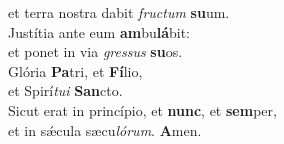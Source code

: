 \oddverse et terra nostra dabit \textit{fru}\textit{ctum} \textbf{su}um.\\
\evenverse Justítia ante eum \textbf{am}bu\textbf{lá}bit:~\*\\
\evenverse et ponet in via \textit{gres}\textit{sus} \textbf{su}os.\\
\oddverse Glória \textbf{Pa}tri, et \textbf{Fí}lio,~\*\\
\oddverse et Spirí\textit{tu}\textit{i} \textbf{San}cto.\\
\evenverse Sicut erat in princípio, et \textbf{nunc}, et \textbf{sem}per,~\*\\
\evenverse et in sǽcula sæcu\textit{ló}\textit{rum}. \textbf{A}men.\\
